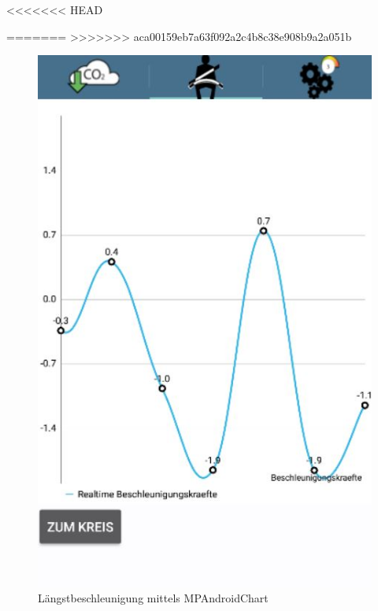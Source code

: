 

<<<<<<< HEAD


 \newline
=======
>>>>>>> aca00159eb7a63f092a2c4b8c38e908b9a2a051b
\begin{figure}[!tbp]
 	\centering
 	\begin{minipage}[b]{0.4\textwidth}
 		\includegraphics[width=\textwidth]{images/Liniendiagramm}
 		\caption{Längstbeschleunigung mittels MPAndroidChart}
 	\end{minipage}
 	\hfill
 	\begin{minipage}[b]{0.4\textwidth}

\end{minipage}
\end{figure}
